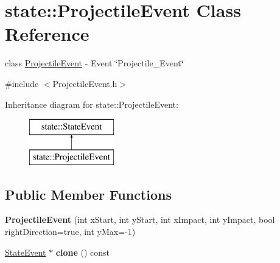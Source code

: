 \hypertarget{classstate_1_1_projectile_event}{}\section{state\+:\+:Projectile\+Event Class Reference}
\label{classstate_1_1_projectile_event}


class \hyperlink{classstate_1_1_projectile_event}{Projectile\+Event} -\/ Event \char`\"{}\+Projectile\+\_\+\+Event\char`\"{}  




{\ttfamily \#include $<$Projectile\+Event.\+h$>$}

Inheritance diagram for state\+:\+:Projectile\+Event\+:\begin{figure}[H]
\begin{center}
\leavevmode
\includegraphics[height=2.000000cm]{classstate_1_1_projectile_event}
\end{center}
\end{figure}
\subsection*{Public Member Functions}
\begin{DoxyCompactItemize}
\item 
\mbox{\label{classstate_1_1_projectile_event_ac928f6136bc7d2b665bd8c6c14494fd4}} 
{\bfseries Projectile\+Event} (int x\+Start, int y\+Start, int x\+Impact, int y\+Impact, bool right\+Direction=true, int y\+Max=-\/1)
\item 
\mbox{\label{classstate_1_1_projectile_event_aade858440992f7404e9a6b82ed18fb11}} 
\hyperlink{classstate_1_1_state_event}{State\+Event} $\ast$ {\bfseries clone} () const
\end{DoxyCompactItemize}
